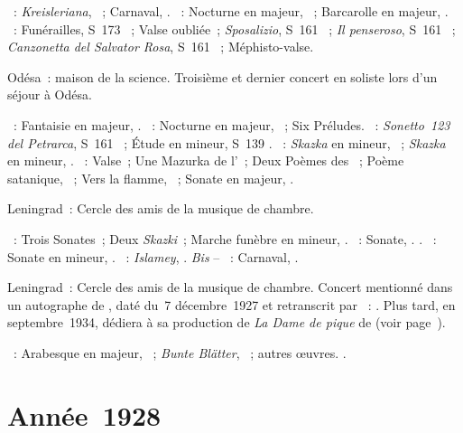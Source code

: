 \begin{description}
 \textsc{\Schumann{}}~: \emph{Kreisleriana}, ~; Carnaval, .
 \textsc{\Chopin{}}~: Nocturne en \kF majeur,  ~;
 Barcarolle en \kF \Sharp majeur, .
 \textsc{\Liszt{}}~: Funérailles, S~173 ~; Valse oubliée~;
 \emph{Sposalizio}, S~161 ~; \emph{Il penseroso}, S~161
 ~; \emph{Canzonetta del Salvator Rosa}, S~161 ~;
 Méphisto-valse.
 \item[\DateWithWeekDay{1927-11-05}]
 Odésa~: maison de la science.
 Troisième et dernier concert en soliste lors d'un séjour à Odésa.

 \textsc{\Schumann{}}~: Fantaisie en \kC majeur, .
 \textsc{\Chopin{}}~: Nocturne en \kF \Sharp majeur,  ~;
 Six Préludes.
 \textsc{\Liszt{}}~: \emph{Sonetto~123 del Petrarca}, S~161 ~;
 Étude en \kF mineur, S~139 .
 \textsc{\Medtner{}}~: \emph{Skazka} en \kF mineur,  ~;
 \emph{Skazka} en \kE mineur,  .
 \textsc{\Scriabine{}}~: Valse~; Une Mazurka de l'~; Deux Poèmes
 des ~; Poème satanique, ~; Vers la flamme,
 ~; Sonate en \kF \Sharp majeur, .
 \item[\DateWithWeekDay{1927-11-18}]
 Leningrad~: Cercle des amis de la musique de chambre.

 \textsc{\Medtner{}}~: Trois Sonates~; Deux \emph{Skazki}~; Marche funèbre
 en \kB mineur,  .
 \textsc{\Scriabine{}}~: Sonate, .
 \textsc{\Liszt{}}.
 \textsc{\Prokofiev{}}~: Sonate en \kA mineur, .
 \textsc{\Balakirev{}}~: \emph{Islamey}, .
 \emph{Bis} -- \textsc{\Schumann{}}~: Carnaval, .
 \item[\DateWithWeekDay{1927-12-02}]
 Leningrad~: Cercle des amis de la musique de chambre.
 Concert mentionné dans un autographe de \VMeyerhold{}, daté du~7
 décembre~1927 et retranscrit par \citet[p.~31]{Sofronitsky82a}~:
 .
 Plus tard, en septembre~1934, \VMeyerhold{} dédiera à \VSofronitsky{} sa
 production de \emph{La Dame de pique} de \Tchaikovski{} (voir
 page~\pageref{bio:LDDP}).

 \textsc{\Schumann{}}~: Arabesque en \kC majeur, ~; \emph{Bunte
 Blätter}, ~; autres œuvres.
 \textsc{\Chopin{}}.
\end{description}

\section{Année~1928}

